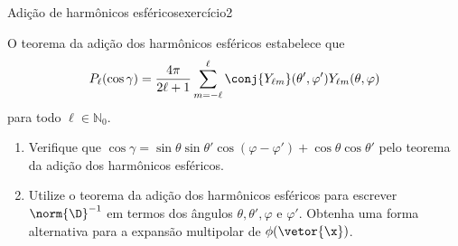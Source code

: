 \begin{exercício}{Adição de harmônicos esféricos}{exercício2}
\begin{center}
    \end{center}
    O teorema da adição dos harmônicos esféricos estabelece que
    \begin{equation*}
        P_\ell(\cos \gamma) = \frac{4\pi}{2\ell + 1} \sum_{m = -\ell}^{\ell} \conj{Y_{\ell m}}(\theta', \varphi')Y_{\ell m}(\theta,\varphi)
    \end{equation*}
    para todo \(\ell \in \mathbb{N}_0\).
    \begin{enumerate}[label=(\alph*)]
        \item Verifique que \(\cos \gamma = \sin\theta \sin\theta' \cos(\varphi - \varphi') + \cos\theta \cos\theta'\) pelo teorema da adição dos harmônicos esféricos.
        \item Utilize o teorema da adição dos harmônicos esféricos para escrever \(\norm{\D}^{-1}\) em termos dos ângulos \(\theta,\theta', \varphi\) e \(\varphi'\). Obtenha uma forma alternativa para a expansão multipolar de \(\phi(\vetor{\x})\).
    \end{enumerate}
\end{exercício}
